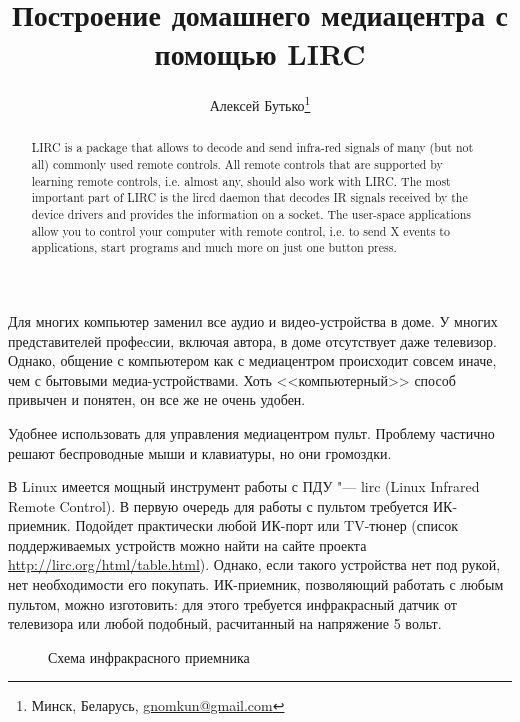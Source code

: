 \documentclass[10pt, a5paper]{article}
\begin{document}
\title{Построение домашнего медиацентра с помощью LIRC}
\author{Алексей Бутько\footnote{Минск, Беларусь, \url{gnomkun@gmail.com}}}
\date{}
\maketitle
\begin{abstract}
LIRC is a package that allows to decode and send infra-red signals
of many (but not all) commonly used remote controls. All remote
controls that are supported by learning remote controls, i.e. almost
any, should also work with LIRC. The most important part of LIRC is
the lircd daemon that decodes IR signals received by the device
drivers and provides the information on a socket. The user-space
applications allow you to control your computer with remote
control, i.e. to send X events to applications, start programs and
much more on just one button press.
\end{abstract}
Для многих компьютер заменил все аудио и видео-устройства в доме.  
У многих представителей профеcсии, включая автора, в доме отсутствует  даже телевизор.
Однако, общение с компьютером как с медиацентром происходит
совсем иначе, чем с бытовыми медиа-устройствами. Хоть <<компьютерный>> способ
привычен и понятен, он все же не очень удобен.

Удобнее использовать для управления медиацентром пульт.
Проблему частично решают беспроводные мыши и клавиатуры, но они
громоздки. 

В Linux имеется мощный инструмент работы с ПДУ "--- lirc  (Linux Infrared Remote Control). В
первую очередь для работы с пультом требуется ИК-приемник. Подойдет
практически любой ИК-порт или TV-тюнер (список поддерживаемых
устройств можно найти  на сайте проекта
\url{http://lirc.org/html/table.html}). Однако, если такого устройства нет
под рукой, нет необходимости его покупать. ИК-приемник,
позволяющий работать с любым пультом, можно изготовить: для
этого требуется инфракрасный датчик от телевизора или любой
подобный, расчитанный на напряжение 5 вольт.

\begin{figure}[ht]
\caption{Схема инфракрасного приемника}
\end{figure}
\end{document}
